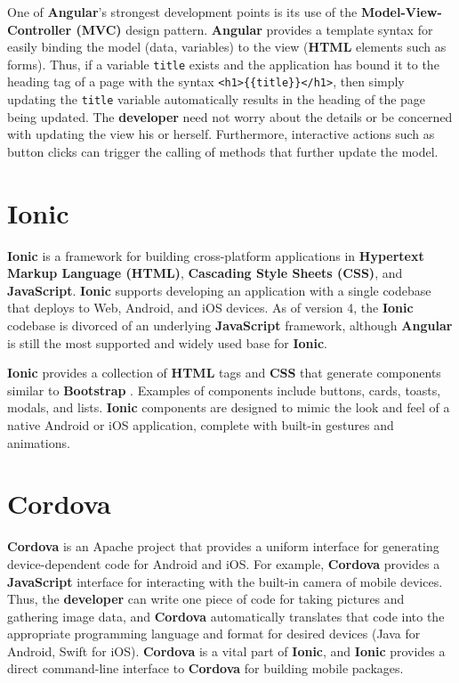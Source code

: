 \documentclass[12pt]{report}
\begin{document}
One of \textbf{Angular}'s strongest development points is its use of the
\textbf{Model-View-Controller (MVC)} design pattern. \textbf{Angular} provides a
template syntax for easily binding the model (data, variables) to the view
(\textbf{HTML} elements such as forms). Thus, if a variable \texttt{title}
exists and the application has bound it to the heading tag of a page with the
syntax \texttt{<h1>\{\{title\}\}</h1>}, then simply updating the \texttt{title}
variable automatically results in the heading of the page being updated. The
\textbf{developer} need not worry about the details or be concerned with
updating the view his or herself. Furthermore, interactive actions such as
button clicks can trigger the calling of methods that further update the model.
    
    \section{Ionic}

\textbf{Ionic} \cite{ionic} is a framework for building cross-platform
applications in \textbf{Hypertext Markup Language (HTML)}, \textbf{Cascading
Style Sheets (CSS)}, and \textbf{JavaScript}. \textbf{Ionic} supports developing
an application with a single codebase that deploys to Web, Android, and iOS
devices. As of version 4, the \textbf{Ionic} codebase is divorced of an
underlying \textbf{JavaScript} framework, although \textbf{Angular} is still the
most supported and widely used base for \textbf{Ionic}.

\textbf{Ionic} provides a collection of \textbf{HTML} tags and \textbf{CSS} that
generate components similar to \textbf{Bootstrap} \cite{bootstrap}.  Examples of
components include buttons, cards, toasts, modals, and lists.  \textbf{Ionic}
components are designed to mimic the look and feel of a native Android or iOS
application, complete with built-in gestures and animations.
    
    \section{Cordova}

\textbf{Cordova} \cite{cordova} is an Apache project that provides a uniform
interface for generating device-dependent code for Android and iOS. For example,
\textbf{Cordova} provides a \textbf{JavaScript} interface for interacting with
the built-in camera of mobile devices. Thus, the \textbf{developer} can write
one piece of code for taking pictures and gathering image data, and
\textbf{Cordova} automatically translates that code into the appropriate
programming language and format for desired devices (Java for Android, Swift for
iOS). \textbf{Cordova} is a vital part of \textbf{Ionic}, and \textbf{Ionic}
provides a direct command-line interface to \textbf{Cordova} for building mobile
packages.
    
\end{document}
